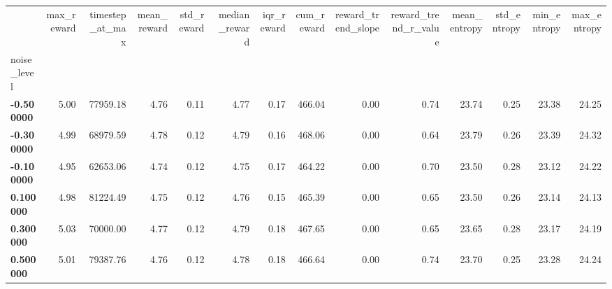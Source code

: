 \begin{tabular}{lrrrrrrrrrrrrr}
\toprule
 & max\_reward & timestep\_at\_max & mean\_reward & std\_reward & median\_reward & iqr\_reward & cum\_reward & reward\_trend\_slope & reward\_trend\_r\_value & mean\_entropy & std\_entropy & min\_entropy & max\_entropy \\
noise_level &  &  &  &  &  &  &  &  &  &  &  &  &  \\
\midrule
\textbf{-0.500000} & 5.00 & 77959.18 & 4.76 & 0.11 & 4.77 & 0.17 & 466.04 & 0.00 & 0.74 & 23.74 & 0.25 & 23.38 & 24.25 \\
\textbf{-0.300000} & 4.99 & 68979.59 & 4.78 & 0.12 & 4.79 & 0.16 & 468.06 & 0.00 & 0.64 & 23.79 & 0.26 & 23.39 & 24.32 \\
\textbf{-0.100000} & 4.95 & 62653.06 & 4.74 & 0.12 & 4.75 & 0.17 & 464.22 & 0.00 & 0.70 & 23.50 & 0.28 & 23.12 & 24.22 \\
\textbf{0.100000} & 4.98 & 81224.49 & 4.75 & 0.12 & 4.76 & 0.15 & 465.39 & 0.00 & 0.65 & 23.50 & 0.26 & 23.14 & 24.13 \\
\textbf{0.300000} & 5.03 & 70000.00 & 4.77 & 0.12 & 4.79 & 0.18 & 467.65 & 0.00 & 0.65 & 23.65 & 0.28 & 23.17 & 24.19 \\
\textbf{0.500000} & 5.01 & 79387.76 & 4.76 & 0.12 & 4.78 & 0.18 & 466.64 & 0.00 & 0.74 & 23.70 & 0.25 & 23.28 & 24.24 \\
\bottomrule
\end{tabular}
